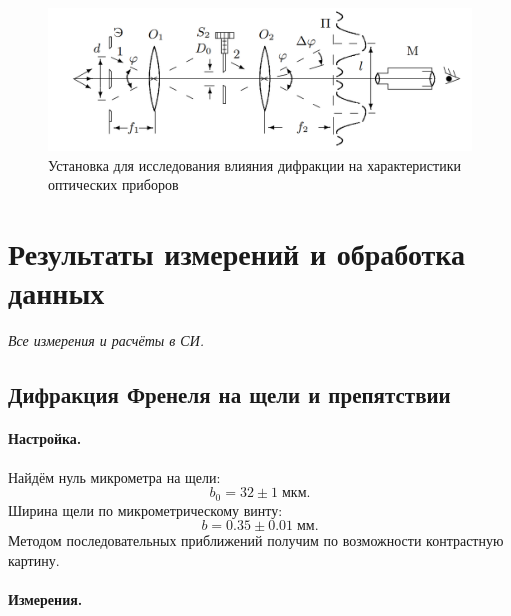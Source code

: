\documentclass[a4paper]{article}
\begin{document}
\begin{figure}[tbp]
	\centering
	\includegraphics[width=0.8\linewidth]{Screenshot_9}
	\caption{Установка для исследования влияния дифракции на характеристики оптических приборов}
	\label{fig:послустановка}
\end{figure}


\section{Результаты измерений и обработка данных}
\emph{Все измерения и расчёты в СИ.}

\subsection{Дифракция Френеля на щели и препятствии}

\paragraph{Настройка.}

Найдём нуль микрометра на щели:
\begin{equation*}\label{key}
	 b_0 = 32 \pm 1 \; мкм.
\end{equation*}
Ширина щели по микрометрическому винту:
\begin{equation*}\label{key}
	b = 0.35 \pm 0.01 \; мм.
\end{equation*}
Методом последовательных приближений получим по возможности контрастную картину.

\paragraph{Измерения.}
\end{document}
